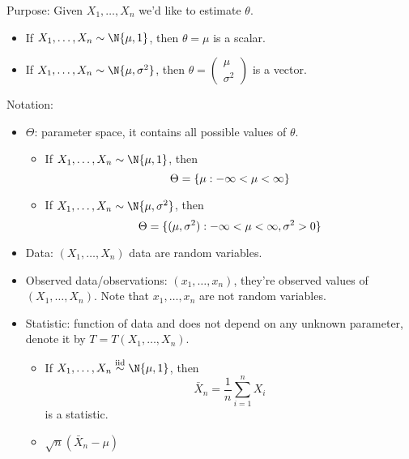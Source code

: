Purpose: Given $ X_1,\ldots,X_n $ we'd like to estimate
$ \theta $.
\begin{Example}{}{}
    \begin{itemize}
        \item If $ X_1,\ldots,X_n \sim \N{\mu,1} $,
              then $ \theta=\mu $ is a scalar.
        \item If $ X_1,\ldots,X_n \sim \N{\mu,\sigma^2} $, then
              $ \theta=\begin{pmatrix}
                      \mu \\
                      \sigma^2
                  \end{pmatrix} $ is a vector.
    \end{itemize}
\end{Example}
Notation:
\begin{itemize}
    \item $ \Theta $: parameter space, it contains all possible values
          of $ \theta $.
          \begin{Example}{}{}
              \begin{itemize}
                  \item If $ X_1,\ldots,X_n \sim \N{\mu,1} $,
                        then
                        \[ \Theta=\{\mu:-\infty<\mu<\infty\} \]
                  \item If $ X_1,\ldots,X_n \sim \N{\mu,\sigma^2} $, then
                        \[ \Theta=\{(\mu,\sigma^2):-\infty<\mu<\infty,\sigma^2>0\} \]
              \end{itemize}
          \end{Example}
    \item Data: $ (X_1,\ldots,X_n) $ data are random variables.
    \item Observed data/observations: $ (x_1,\ldots,x_n) $,
          they're observed values of $ (X_1,\ldots,X_n) $.
          Note that
          $ x_1,\ldots,x_n $ are not random variables.
    \item Statistic: function of data and does not depend on any
          unknown parameter, denote it by $ T=T(X_1,\ldots,X_n) $.
          \begin{Example}{}{}
              \begin{itemize}
                  \item If $ X_1,\ldots,X_n \stackrel{\text{iid}}{\sim}\N{\mu,1} $,
                        then
                        \[ \bar{X}_n=\frac{1}{n} \sum_{i=1}^{n} X_i \]
                        is a statistic.
                  \item $ \sqrt{n}(\bar{X}_n-\mu) $

\end{itemize}
\end{Example}
\end{itemize}

